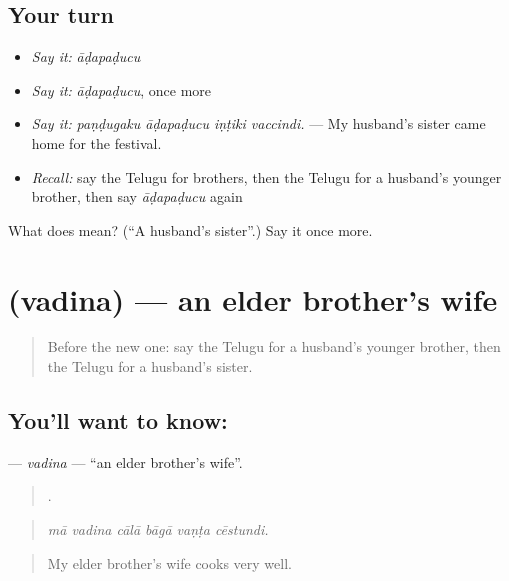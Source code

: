 \subsection*{Your turn}
\begin{itemize}
\raggedright
  \item \emph{Say it:} \emph{āḍapaḍucu}
  \item \emph{Say it:} \emph{āḍapaḍucu}, once more
  \item \emph{Say it:} \emph{paṇḍugaku āḍapaḍucu iṇṭiki vaccindi.} — My husband's sister came home for the festival.
  \item \emph{Recall:} say the Telugu for brothers, then the Telugu for a husband's younger brother, then say \emph{āḍapaḍucu} again
\end{itemize}

\begin{tcolorbox}[breakable,colback=teal!4,colframe=teal!35!black,title={Before you move on}]
What does  mean? (\textquotedblleft{}A husband's sister\textquotedblright{}.) Say it once more.
\end{tcolorbox}
\section[\texorpdfstring{\te{వదిన} (vadina)}{వదిన (vadina)}]{ (vadina) — an elder brother's wife}

\label{lesson:TE-C528-vadina}



\begin{quote}
Before the new one: say the Telugu for a husband's younger brother, then the Telugu for a husband's sister.
\end{quote}

\subsection*{You'll want to know: }
\textbf{} — \emph{vadina} — \textquotedblleft{}an elder brother's wife\textquotedblright{}.

\begin{quote}
     .
\end{quote}

\begin{quote}
\emph{mā vadina cālā bāgā vaṇṭa cēstundi.}
\end{quote}

\begin{quote}
My elder brother's wife cooks very well.
\end{quote}

